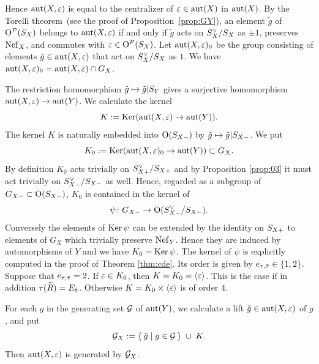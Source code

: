 \documentclass{amsart}
\numberwithin{procedure}{section}
\renewcommand{\ker}{\Ker}
\begin{document}
Hence $\mathord{\rm{aut}}(X, \varepsilon)$ is equal to the centralizer of $\varepsilon\in\mathord{\rm{aut}}(X)$ in $\mathord{\rm{aut}}(X)$.
 By the Torelli theorem~(see the proof of Proposition~\ref{prop:GY}),
 an element $\tilde{g}$ of  $\mathord{\mathrm{O}}^{\mathord{\mathcal P}}(S_{X})$ belongs to 
 $\mathord{\rm{aut}}(X, \varepsilon)$  if and only if 
 $\tilde{g}$ acts on $S_{X}\sp{\vee}/S_{X}$ as $\pm 1$,
 preserves $\mathord{\rm Nef}_{X}$, and commutes with $\varepsilon\in \mathord{\mathrm{O}}^{\mathord{\mathcal P}}(S_{X})$.
 Let 
 $\mathord{\rm{aut}}(X,\varepsilon)_0$ be the group 
 consisting of elements  $\tilde{g} \in \mathord{\rm{aut}}(X, \varepsilon)$  that 
act on $S_{X}\sp{\vee}/S_{X}$ as $1$.
 We have $\mathord{\rm{aut}}(X,\varepsilon)_0=\mathord{\rm{aut}}(X,\varepsilon)\cap G_X$.
\par
The restriction homomorphism 
$\tilde{g}\mapsto \tilde{g}|S_{Y}$
gives a surjective homomorphism $\mathord{\rm{aut}}(X, \varepsilon) \to \mathord{\rm{aut}}(Y)$.
We calculate the kernel
\[
K:=\operatorname{\mathrm{Ker}}\nolimits(\mathord{\rm{aut}}(X, \varepsilon) \to \mathord{\rm{aut}}(Y)).
\]
The kernel $K$ is naturally embedded into $\mathord{\mathrm{O}}(S_{X-})$
by $\tilde{g}\mapsto \tilde{g}|S_{X-}$.
We  put 
\[
K_0:=\operatorname{\mathrm{Ker}}\nolimits(\mathord{\rm{aut}}(X,\varepsilon)_0 \to \mathord{\rm{aut}}(Y))\subset G_X.
\]
By definition $K_0$ acts trivially on $S_{X+}\sp{\vee}/ S_{X+}$ and by
Proposition \ref{prop:03} it must act trivially on $S_{X-}\sp{\vee}/S_{X-}$ as well. 
Hence, regarded as a subgroup of $G_{X-}\subset \mathord{\mathrm{O}}(S_{X-})$, $K_0$ is contained in the kernel of
\[\psi\colon G_{X-}\rightarrow \mathord{\mathrm{O}}(S_{X-}\sp{\vee}/S_{X-}).\]
Conversely the elements of $\ker \psi$ can be extended by the identity on $S_{X+}$ to elements of $G_X$ 
which trivially preserve $\mathord{\rm Nef}_Y$.
Hence they are induced by automorphisms of $Y$ and we have $K_0 = \ker \psi$. 
The kernel of $\psi$ is explicitly computed in the proof of Theorem \ref{thm:cde}. 
Its order is given by $e_{\tau,\bar{\tau}} \in \{1,2\}$.
Suppose that $e_{\tau,\bar{\tau}} =2$.
If $\varepsilon \in K_0$, then $K=K_0=\langle \varepsilon \rangle$.
This is the case if in addition $\tau(\widetilde{R})=E_8$.
Otherwise $K=K_0 \times \langle \varepsilon\rangle$ is of order $4$.
%
\par
For each $g$ in the generating set $\mathord{\mathcal G}$ of $\mathord{\rm{aut}}(Y)$, we calculate a lift
$\tilde{g}\in \mathord{\rm{aut}}(X, \varepsilon)$ of $g$, 
and put 
\[
\mathord{\mathcal G}_X:=\{\,{\tilde{g}}\mid {g\in \mathord{\mathcal G}} \,\} \; \cup\;K.
\]
Then $\mathord{\rm{aut}}(X, \varepsilon)$ is generated by $\mathord{\mathcal G}_X$.
%
\end{document}
